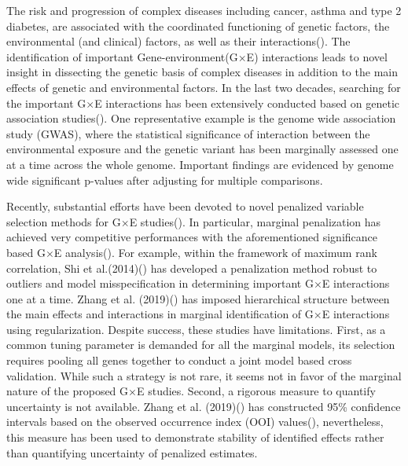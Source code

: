 \documentclass[12pt]{article}
\begin{document}
The risk and progression of complex diseases including cancer, asthma and type 2 diabetes, are associated with the coordinated functioning of genetic factors, the environmental (and clinical) factors, as well as their interactions(\cite{HUNTER,SIM,VON, CORN}). The identification of important Gene-environment(G$\times$E) interactions leads to novel insight in dissecting the genetic basis of complex diseases in addition to the main effects of genetic and environmental factors. In the last two decades, searching for the important G$\times$E interactions has been extensively conducted based on genetic association studies(\cite{CORD,WLC}). One representative example is the genome wide association study (GWAS),  where the statistical significance of interaction between the environmental exposure and the genetic variant has been marginally assessed one at a time across the whole genome. Important findings are evidenced by genome wide significant p-values after adjusting for multiple comparisons.   \par

Recently, substantial efforts have been devoted to novel penalized variable selection methods for G$\times$E studies(\cite{ZFR}). In particular, marginal penalization has achieved very competitive performances with the aforementioned significance based G$\times$E analysis(\cite{SLH, CZJ,ZSX}). For example, within the framework of maximum rank correlation, Shi et al.(2014)(\cite{SLH}) has developed a penalization method robust to outliers and model misspecification in determining important G$\times$E interactions one at a time. Zhang et al. (2019)(\cite{ZSX}) has imposed hierarchical structure between the main effects and interactions in marginal identification of G$\times$E interactions using regularization. Despite success, these studies have limitations. First, as a common tuning parameter is demanded for all the marginal models, its selection requires pooling all genes together to conduct a joint model based cross validation. While such a strategy is not rare, it seems not in favor of the marginal nature of the proposed G$\times$E studies.  Second, a rigorous measure to quantify uncertainty is not available. Zhang et al. (2019)(\cite{ZSX}) has constructed 95\% confidence intervals based on the observed occurrence index (OOI) values(\cite{HJM}), nevertheless, this measure has been used to demonstrate stability of identified effects rather than quantifying uncertainty of penalized estimates.    \par
\end{document}
